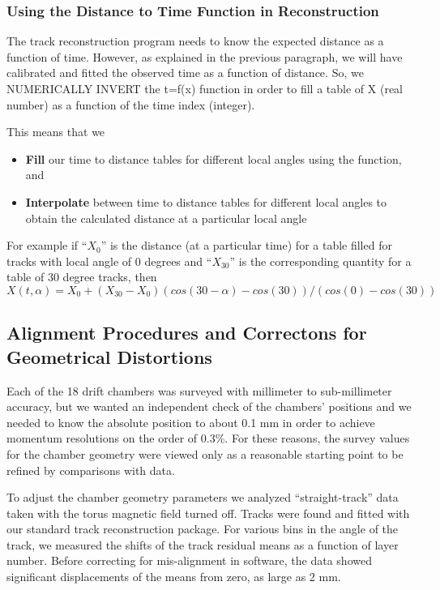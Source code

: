 \subsubsection{Using the Distance to Time Function in Reconstruction}
The track reconstruction program needs to know the expected distance as a function
of time.  However, as explained in the previous paragraph, we will have calibrated and fitted
the observed time as a function of distance.  So, we NUMERICALLY INVERT the t=f(x)
function in order to fill a table of X (real number) as a function of the time index (integer).


This means that we
\begin{itemize}
\item {\bf Fill} our time to distance tables for different local angles using the function, and
\item {\bf Interpolate} between time to distance tables for different local angles to obtain
the calculated distance at a particular local angle
\end{itemize}
For example if ``$X_0$'' is the distance (at a particular time) for a table filled for tracks with local angle of 0 degrees
and ``$X_{30}$'' is the corresponding quantity for a table of 30 degree tracks, then
\begin{equation} 
\label{eq-extrap30}
X(t,\alpha) = X_0 + (X_{30}-X_0) (cos(30-\alpha) - cos(30)) / (cos(0) - cos(30))
\end{equation}


\subsection{Alignment Procedures and Correctons for Geometrical Distortions}
\label{align}

Each of the 18 drift chambers was 
surveyed with millimeter to sub-millimeter
accuracy, but we wanted an independent check of the chambers' positions and 
we needed to know the absolute position to about 0.1 mm in order to 
achieve momentum resolutions on the order of 0.3\%.  For 
these reasons, the survey values for the chamber geometry were viewed only as 
a reasonable starting point to be refined by comparisons with data.

To adjust the chamber geometry parameters we analyzed
``straight-track'' data taken with the torus magnetic field turned off.  
Tracks were found and fitted with our standard track reconstruction package.
For various bins in the angle of the track, we measured the shifts of the
track residual means as a function of layer number. 
Before correcting for mis-alignment in software, the data showed significant 
displacements of the means from zero, as large as 2 mm.  

